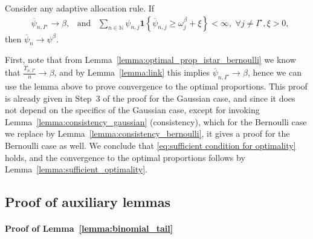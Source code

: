 \begin{lemma}
\begin{leftbar}
	Consider any adaptive allocation rule. If 
		\begin{align}
		&\overline{\psi}_{n, I^\star} \rightarrow \beta, \,\,\, \text{ and } \,\,\,
		\sum_{n \in \mathbb{N}} \psi_{n,j} \bm{1} \left\lbrace \overline{\psi}_{n,j} \geq \omega_j^\beta + \xi \right\rbrace < \infty, \,\, \forall j \neq I^\star, \xi > 0,
		\end{align}
	then $\overline{\psi}_{n} \rightarrow \psi^\beta$.
\end{leftbar}
\end{lemma}

First, note that from Lemma~\ref{lemma:optimal_prop_istar_bernoulli} we know that $\frac{T_{n,I^\star}}{n} \rightarrow \beta$, and by Lemma~\ref{lemma:link} this implies $\overline{\psi}_{n, I^\star} \rightarrow \beta$, hence we can use the lemma above to prove convergence to the optimal proportions. This proof is already given in Step~3 of the proof for the Gaussian case, and since it does not depend on the specifics of the Gaussian case, except for invoking Lemma~\ref{lemma:consistency_gaussian} (consistency), which for the Bernoulli case we replace by Lemma~\ref{lemma:consistency_bernoulli}, it gives a proof for the Bernoulli case as well. We conclude that \eqref{eq:sufficient condition for optimality} holds, and the convergence to the optimal proportions follows by Lemma~\ref{lemma:sufficient_optimality}.

\subsection{Proof of auxiliary lemmas}\label{app:posterior_beta.aux}

\paragraph{Proof of Lemma~\ref{lemma:binomial_tail}}

